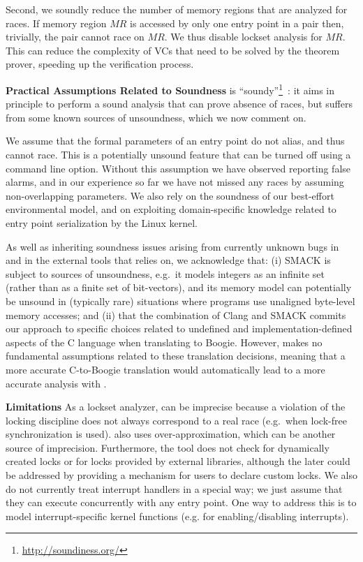 Second, we soundly reduce the number of memory regions that are analyzed for races.  If memory region $\mathit{MR}$ is accessed by only one entry point in a pair then, trivially, the pair cannot race on $\mathit{MR}$.  We thus disable lockset analysis for $\mathit{MR}$.  This can reduce the complexity of VCs that need to be solved by the theorem prover, speeding up the verification process.

\noindent\textbf{Practical Assumptions Related to Soundness}
%
\whoop is ``soundy''\footnote{\url{http://soundiness.org/}}~\cite{soundiness}: it aims in principle to perform a sound analysis that can prove absence of races, but suffers from some known sources of unsoundness, which we now comment on.

We assume that the formal parameters of an entry point do not alias, and thus cannot race. This is a potentially unsound feature that can be turned off using a command line option.  Without this assumption we have observed \whoop reporting false alarms, and in our experience so far we have not missed any races by assuming non-overlapping parameters.  We also rely on the soundness of our best-effort environmental model, and on exploiting domain-specific knowledge related to entry point serialization by the Linux kernel.

As well as inheriting soundness issues arising from currently unknown bugs in \whoop and in the external tools that \whoop relies on, we acknowledge that: (i) SMACK is subject to sources of unsoundness, e.g.\ it models integers as an infinite set (rather than as a finite set of bit-vectors), and its memory model can potentially be unsound in (typically rare) situations where programs use unaligned byte-level memory accesses; and (ii) that the combination of Clang and SMACK commits our approach to specific choices related to undefined and implementation-defined aspects of the C language when translating to Boogie.  However, \whoop makes no fundamental assumptions related to these translation decisions, meaning that a more accurate C-to-Boogie translation would automatically lead to a more accurate analysis with \whoop.

\noindent\textbf{Limitations }
%
As a lockset analyzer, \whoop can be imprecise because a violation of the locking discipline does not always correspond to a real race (e.g.\ when lock-free synchronization is used). \whoop also uses over-approximation, which can be another source of imprecision. Furthermore, the tool does not check for dynamically created locks or for locks provided by external libraries, although the later could be addressed by providing a mechanism for users to declare custom locks. We also do not currently treat interrupt handlers in a special way; we just assume that they can execute concurrently with any entry point. One way to address this is to model interrupt-specific kernel functions (e.g. for enabling/disabling interrupts).

